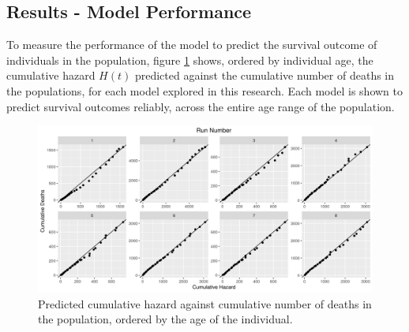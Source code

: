 \documentclass[
]{article}
\begin{document}
\hypertarget{results---model-performance}{%
\subsection{Results - Model Performance}\label{results---model-performance}}

To measure the performance of the model to predict the survival outcome of individuals in the population, figure \ref{fig:cumpred} shows, ordered by individual age, the cumulative hazard \(H(t)\) predicted against the cumulative number of deaths in the populations, for each model explored in this research. Each model is shown to predict survival outcomes reliably, across the entire age range of the population.

\begin{figure}
\hypertarget{fig:cumpred}{%
\centering
\includegraphics{./Plots/Survival/redlinpred_Cumulative_haz-death_age.png}
\caption{Predicted cumulative hazard against cumulative number of deaths in the population, ordered by the age of the individual.}\label{fig:cumpred}
}
\end{figure}
\end{document}
